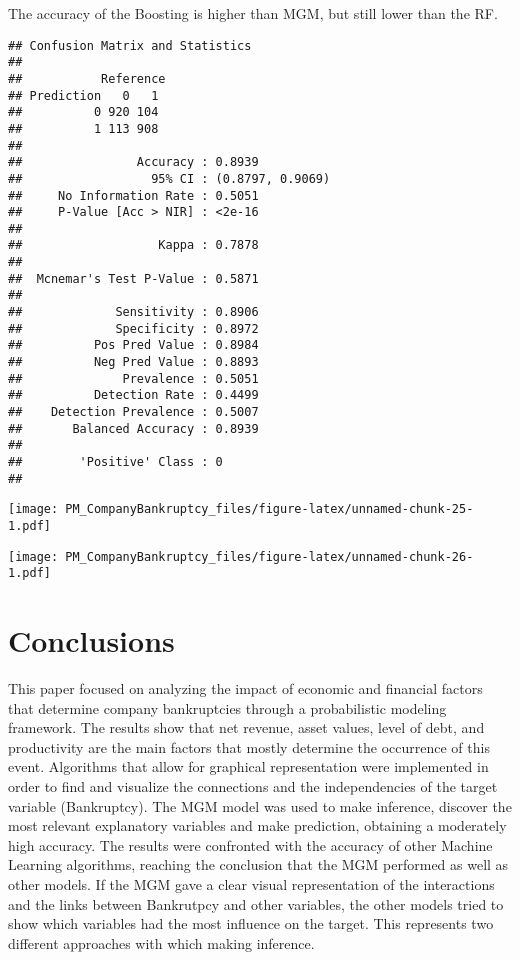 \documentclass[
]{article}
\begin{document}
The accuracy of the Boosting is higher than MGM, but still lower than
the RF.

\begin{verbatim}
## Confusion Matrix and Statistics
## 
##           Reference
## Prediction   0   1
##          0 920 104
##          1 113 908
##                                           
##                Accuracy : 0.8939          
##                  95% CI : (0.8797, 0.9069)
##     No Information Rate : 0.5051          
##     P-Value [Acc > NIR] : <2e-16          
##                                           
##                   Kappa : 0.7878          
##                                           
##  Mcnemar's Test P-Value : 0.5871          
##                                           
##             Sensitivity : 0.8906          
##             Specificity : 0.8972          
##          Pos Pred Value : 0.8984          
##          Neg Pred Value : 0.8893          
##              Prevalence : 0.5051          
##          Detection Rate : 0.4499          
##    Detection Prevalence : 0.5007          
##       Balanced Accuracy : 0.8939          
##                                           
##        'Positive' Class : 0               
## 
\end{verbatim}

\texttt{[image: PM\_CompanyBankruptcy\_files/figure-latex/unnamed-chunk-25-1.pdf]}

\texttt{[image: PM\_CompanyBankruptcy\_files/figure-latex/unnamed-chunk-26-1.pdf]}

\hypertarget{conclusions}{%
\section{Conclusions}\label{conclusions}}

This paper focused on analyzing the impact of economic and financial
factors that determine company bankruptcies through a probabilistic
modeling framework. The results show that net revenue, asset values,
level of debt, and productivity are the main factors that mostly
determine the occurrence of this event. Algorithms that allow for
graphical representation were implemented in order to find and visualize
the connections and the independencies of the target variable
(Bankruptcy). The MGM model was used to make inference, discover the
most relevant explanatory variables and make prediction, obtaining a
moderately high accuracy. The results were confronted with the accuracy
of other Machine Learning algorithms, reaching the conclusion that the
MGM performed as well as other models. If the MGM gave a clear visual
representation of the interactions and the links between Bankrutpcy and
other variables, the other models tried to show which variables had the
most influence on the target. This represents two different approaches
with which making inference.
\end{document}
